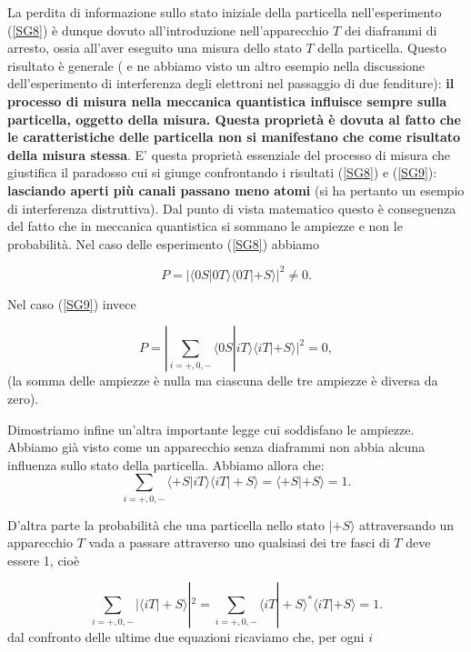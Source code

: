\documentclass[a4paper,12pt,oneside]{book}
\begin{document}
La perdita di informazione sullo stato iniziale della particella nell'esperimento (\ref{SG8}) è dunque dovuto all'introduzione nell'apparecchio $T$ dei diaframmi di arresto, ossia all'aver eseguito una misura dello stato $T$ della particella. Questo risultato è generale ( e ne abbiamo visto un altro esempio nella discussione dell'esperimento di interferenza degli elettroni nel passaggio di due fenditure): \textbf{il processo di misura nella meccanica quantistica influisce sempre sulla particella, oggetto della misura. Questa proprietà è dovuta al fatto che le caratteristiche delle particella non si manifestano che come risultato della misura stessa}.
E' questa proprietà essenziale del processo di misura che giustifica il paradosso cui si giunge confrontando i risultati (\ref{SG8}) e (\ref{SG9}): \textbf{lasciando aperti più canali passano meno atomi} (si ha pertanto un esempio di interferenza distruttiva). Dal punto di vista matematico questo è conseguenza del fatto che in meccanica quantistica si sommano le ampiezze e non le probabilità.
Nel caso delle esperimento (\ref{SG8}) abbiamo

\begin{equation}
P= | \langle 0S | 0T \rangle \langle 0T | +S \rangle  |^2 \neq 0 .
\end{equation}

Nel caso (\ref{SG9}) invece

\begin{equation}
P= |\sum \limits_{i=+,0,-}\langle 0S | iT \rangle \langle iT | +S \rangle |^2 =0 ,
\end{equation}
(la somma delle ampiezze è nulla ma ciascuna delle tre ampiezze è diversa da zero).

Dimostriamo infine un'altra importante legge cui soddisfano le ampiezze. Abbiamo già visto come un apparecchio senza diaframmi non abbia alcuna influenza sullo stato della particella. Abbiamo allora che:
\begin{equation}
\sum \limits_{i=+,0,-}\langle +S | iT \rangle \langle iT | +S \rangle = \langle +S | +S \rangle =1 .
\end{equation}

D'altra parte la probabilità che una particella nello stato $| +S \rangle$ attraversando un apparecchio $T$ vada a passare attraverso uno qualsiasi dei tre fasci di $T$ deve essere 1, cioè

\begin{equation}
\sum \limits_{i=+,0,-}|\langle iT | +S \rangle|^2= \sum \limits_{i=+,0,-} \langle iT | +S \rangle ^* \langle iT | +S \rangle= 1 .
\end{equation}
dal confronto delle ultime due equazioni ricaviamo che, per ogni $i$
\end{document}
